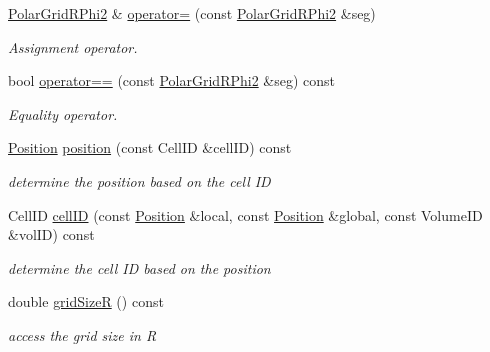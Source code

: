 \begin{DoxyCompactItemize}
\hyperlink{class_d_d4hep_1_1_geometry_1_1_polar_grid_r_phi2}{PolarGridRPhi2} \& \hyperlink{class_d_d4hep_1_1_geometry_1_1_polar_grid_r_phi2_a46530db9beff3425dccd34bc60e9c7db}{operator=} (const \hyperlink{class_d_d4hep_1_1_geometry_1_1_polar_grid_r_phi2}{PolarGridRPhi2} \&seg)
\begin{DoxyCompactList}\small\item\em Assignment operator. \item\end{DoxyCompactList}\item 
bool \hyperlink{class_d_d4hep_1_1_geometry_1_1_polar_grid_r_phi2_a06055e1c6d889eee992da2a8b51ba651}{operator==} (const \hyperlink{class_d_d4hep_1_1_geometry_1_1_polar_grid_r_phi2}{PolarGridRPhi2} \&seg) const 
\begin{DoxyCompactList}\small\item\em Equality operator. \item\end{DoxyCompactList}\item 
\hyperlink{namespace_d_d4hep_1_1_geometry_a55083902099d03506c6db01b80404900}{Position} \hyperlink{class_d_d4hep_1_1_geometry_1_1_polar_grid_r_phi2_a07da4b6472d023511e5b4320c7a6190f}{position} (const CellID \&cellID) const 
\begin{DoxyCompactList}\small\item\em determine the position based on the cell ID \item\end{DoxyCompactList}\item 
CellID \hyperlink{class_d_d4hep_1_1_geometry_1_1_polar_grid_r_phi2_a26ecb558de4d95a8e3619704d5a6d528}{cellID} (const \hyperlink{namespace_d_d4hep_1_1_geometry_a55083902099d03506c6db01b80404900}{Position} \&local, const \hyperlink{namespace_d_d4hep_1_1_geometry_a55083902099d03506c6db01b80404900}{Position} \&global, const VolumeID \&volID) const 
\begin{DoxyCompactList}\small\item\em determine the cell ID based on the position \item\end{DoxyCompactList}\item 
double \hyperlink{class_d_d4hep_1_1_geometry_1_1_polar_grid_r_phi2_a8b208a163e07289eec58c27d9e4bbda5}{gridSizeR} () const 
\begin{DoxyCompactList}\small\item\em access the grid size in R \item\end{DoxyCompactList}\item 

\end{DoxyCompactItemize}

